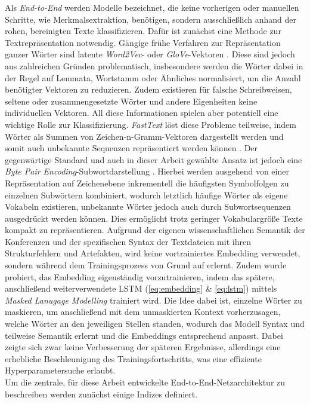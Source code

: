 \documentclass[bachelor,german]{info1thesis}
\begin{document}
Als \textit{End-to-End} werden Modelle bezeichnet, die keine vorherigen oder manuellen Schritte, wie Merkmalsextraktion, benötigen, sondern ausschließlich anhand der rohen, bereinigten Texte klassifizieren. Dafür ist zunächst eine Methode zur Textrepräsentation notwendig. Gängige frühe Verfahren zur Repräsentation ganzer Wörter sind latente \textit{Word2Vec}- oder \textit{GloVe}-Vektoren \cite{Mikolov2013,Pennington2014}. Diese sind jedoch aus zahlreichen Gründen problematisch, insbesondere werden die Wörter dabei in der Regel auf Lemmata, Wortstamm oder Ähnliches normalisiert, um die Anzahl benötigter Vektoren zu reduzieren. Zudem existieren für falsche Schreibweisen, seltene oder zusammengesetzte Wörter und andere Eigenheiten keine individuellen Vektoren. All diese Informationen spielen aber potentiell eine wichtige Rolle zur Klassifizierung. \textit{FastText} löst diese Probleme teilweise, indem Wörter als Summen von Zeichen-n-Gramm-Vektoren dargestellt werden und somit auch unbekannte Sequenzen repräsentiert werden können \cite{Bojanowski2016}. Der gegenwärtige Standard und auch in dieser Arbeit gewählte Ansatz ist jedoch eine \textit{Byte Pair Encoding}-Subwortdarstellung \cite{Sennrich2015}. Hierbei werden ausgehend von einer Repräsentation auf Zeichenebene inkrementell die häufigsten Symbolfolgen zu einzelnen Subwörtern kombiniert, wodurch letztlich häufige Wörter als eigene Vokabeln existieren, unbekannte Wörter jedoch auch durch Subwortsequenzen ausgedrückt werden können. Dies ermöglicht trotz geringer Vokabulargröße Texte kompakt zu repräsentieren. Aufgrund der eigenen wissenschaftlichen Semantik der Konferenzen und der spezifischen Syntax der Textdateien mit ihren Strukturfehlern und Artefakten, wird keine vortrainiertes Embedding verwendet, sondern während dem Trainingsprozess von Grund auf erlernt. Zudem wurde probiert, das Embedding eigenständig vorzutrainieren, indem das spätere, anschließend weiterverwendete LSTM (\autoref{eq:embedding} \& \ref{eq:lstm}) mittels \textit{Masked Lanugage Modelling} trainiert wird. Die Idee dabei ist, einzelne Wörter zu maskieren, um anschließend mit dem unmaskierten Kontext vorherzusagen, welche Wörter an den jeweiligen Stellen standen, wodurch das Modell Syntax und teilweise Semantik erlernt und die Embeddings entsprechend anpasst. Dabei zeigte sich zwar keine Verbesserung der späteren Ergebnisse, allerdings eine erhebliche Beschleunigung des Trainingsfortschritts, was eine effiziente Hyperparametersuche erlaubt. \\
Um die zentrale, für diese Arbeit entwickelte End-to-End-Netzarchitektur zu beschreiben werden zunächst einige Indizes definiert.
\end{document}
